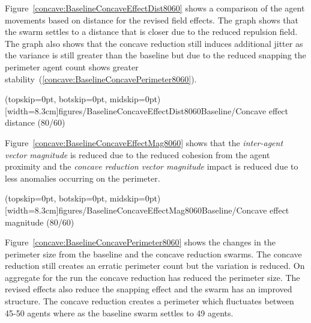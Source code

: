 \documentclass{ieeeaccess}
\begin{document}
Figure~\ref{concave:BaselineConcaveEffectDist8060} shows a comparison of the agent movements based on distance for the revised field effects. The graph shows that the swarm settles to a distance that is closer due to the reduced repulsion field. The graph also shows that the concave reduction still induces additional jitter as the variance is still greater than the baseline but due to the reduced snapping the perimeter agent count shows greater stability~(\ref{concave:BaselineConcavePerimeter8060}). 

\Figure[t!](topskip=0pt, botskip=0pt, midskip=0pt)[width=8.3cm]{figures/BaselineConcaveEffectDist8060}{Baseline/Concave effect distance (80/60)\label{concave:BaselineConcaveEffectDist8060}}

Figure~\ref{concave:BaselineConcaveEffectMag8060} shows that the \textit{inter-agent vector magnitude} is reduced due to the reduced cohesion from the agent proximity and the \textit{concave reduction vector magnitude} impact is reduced due to less anomalies occurring on the perimeter.

\Figure[t!](topskip=0pt, botskip=0pt, midskip=0pt)[width=8.3cm]{figures/BaselineConcaveEffectMag8060}{Baseline/Concave effect magnitude (80/60)\label{concave:BaselineConcaveEffectMag8060}}

Figure~\ref{concave:BaselineConcavePerimeter8060} shows the changes in the perimeter size from the baseline and the concave reduction swarms. The concave reduction still creates an erratic perimeter count but the variation is reduced. On aggregate for the run the concave reduction has reduced the perimeter size. The revised effects also reduce the snapping effect and the swarm has an improved structure. The concave reduction creates a perimeter which fluctuates between 45-50 agents where as the baseline swarm settles to 49 agents.
\end{document}

